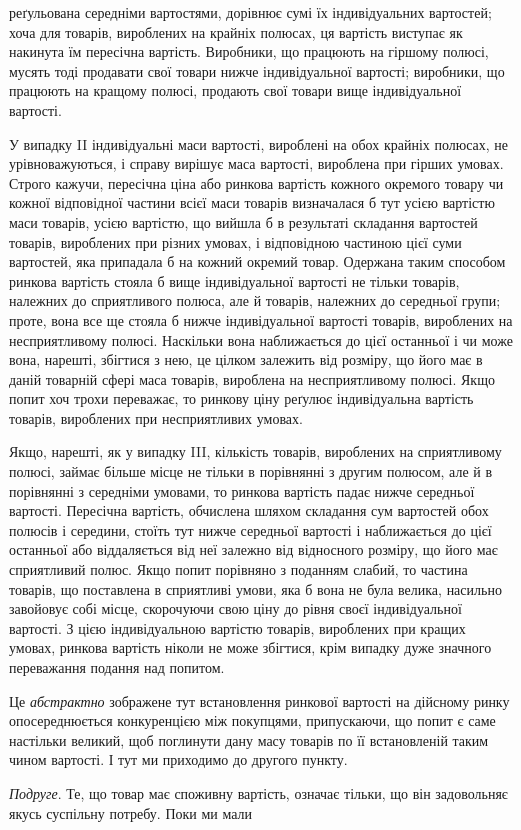 \parcont{}  %
реґульована середніми вартостями, дорівнює сумі їх індивідуальних вартостей; хоча для товарів,
вироблених на крайніх полюсах, ця вартість виступає як накинута їм пересічна вартість. Виробники, що
працюють на гіршому полюсі, мусять тоді продавати свої товари нижче індивідуальної вартості;
виробники,
що працюють на кращому полюсі, продають свої товари вище
індивідуальної вартості.

У випадку II індивідуальні маси вартості, вироблені на обох
крайніх полюсах, не урівноважуються, і справу вирішує маса
вартості, вироблена при гірших умовах. Строго кажучи, пересічна ціна або ринкова вартість кожного
окремого товару чи
кожної відповідної частини всієї маси товарів визначалася б тут
усією вартістю маси товарів, усією вартістю, що вийшла б
в результаті складання вартостей товарів, вироблених при різних умовах, і відповідною частиною цієї
суми вартостей, яка
припадала б на кожний окремий товар. Одержана таким способом ринкова вартість стояла б вище
індивідуальної вартості
не тільки товарів, належних до сприятливого полюса, але й товарів, належних до середньої групи;
проте, вона все ще стояла б
нижче індивідуальної вартості товарів, вироблених на несприятливому полюсі. Наскільки вона
наближається до цієї останньої
і чи може вона, нарешті, збігтися з нею, це цілком залежить від
розміру, що його має в даній товарній сфері маса товарів,
вироблена на несприятливому полюсі. Якщо попит хоч трохи
переважає, то ринкову ціну реґулює індивідуальна вартість товарів, вироблених при несприятливих
умовах.

Якщо, нарешті, як у випадку III, кількість товарів, вироблених на сприятливому полюсі, займає більше
місце не тільки
в порівнянні з другим полюсом, але й в порівнянні з середніми
умовами, то ринкова вартість падає нижче середньої вартості.
Пересічна вартість, обчислена шляхом складання сум вартостей
обох полюсів і середини, стоїть тут нижче середньої вартості
і наближається до цієї останньої або віддаляється від неї
залежно від відносного розміру, що його має сприятливий полюс.
Якщо попит порівняно з поданням слабий, то частина товарів,
що поставлена в сприятливі умови, яка б вона не була велика,
насильно завойовує собі місце, скорочуючи свою ціну до рівня
своєї індивідуальної вартості. З цією індивідуальною вартістю
товарів, вироблених при кращих умовах, ринкова вартість ніколи
не може збігтися, крім випадку дуже значного переважання подання над попитом.

Це \emph{абстрактно} зображене тут встановлення ринкової вартості на дійсному ринку опосереднюється
конкуренцією між
покупцями, припускаючи, що попит є саме настільки великий,
щоб поглинути дану масу товарів по її встановленій таким
чином вартості. І тут ми приходимо до другого пункту.

\emph{Подруге}. Те, що товар має споживну вартість, означає тільки,
що він задовольняє якусь суспільну потребу. Поки ми мали
\parbreak{}  %
